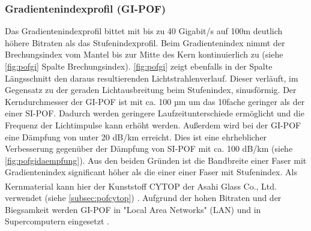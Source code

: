 \subsubsection{Gradientenindexprofil (GI-POF)}

Das Gradientenindexprofil bittet mit bis zu 40 Gigabit/s auf 100m deutlich
höhere Bitraten als das Stufenindexprofil. Beim Gradientenindex nimmt der
Brechungsindex vom Mantel bis zur Mitte des Kern kontinuierlich zu (siehe
\autoref{fig:pofgi} Spalte Brechungsindex). \autoref{fig:pofgi} zeigt ebenfalls
in der Spalte Längsschnitt den daraus resultierenden Lichtstrahlenverlauf.
Dieser verläuft, im Gegensatz zu der geraden Lichtausbreitung beim Stufenindex,
sinusförmig. Der Kerndurchmesser der GI-POF ist mit ca. 100 µm um das 10fache
geringer als der einer SI-POF. Dadurch werden geringere Laufzeitunterschiede
ermöglicht und die Frequenz der Lichtimpulse kann erhöht werden. Außerdem wird
bei der GI-POF eine Dämpfung von unter 20 dB/km erreicht. Dies ist eine
ehrheblicher Verbesserung gegenüber der Dämpfung von SI-POF mit ca. 100 dB/km
(siehe \autoref{fig:pofgidaempfung}). Aus den beiden Gründen ist die Bandbreite
einer Faser mit Gradientenindex significant höher als die einer einer Faser mit
Stufenindex. Als Kernmaterial kann hier der Kunststoff
CYTOP\textsuperscript{\texttrademark} der Asahi Glass Co., Ltd. verwendet (siehe
\autoref{subsec:pofcytop}) \cite{pofacgif}. Aufgrund der hohen Bitraten und der
Biegsamkeit werden GI-POF in "Local Area
Networks" (LAN) und in Supercomputern eingesetzt \cite{poflee}.

